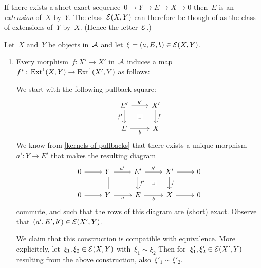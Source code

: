\begin{remark*}
   If there exists a short exact sequence~$0 \to Y \to E \to X \to 0$ then~$E$ is an \emph{extension} of~$X$ by~$Y$.
   The class~$\mathcal{E}(X,Y)$ can therefore be though of as the class of extensions of~$Y$ by~$X$.
   (Hence the letter~$\mathcal{E}$.)
\end{remark*}


\begin{remark}
  Let~$X$ and~$Y$ be objects in~$\mathcal{A}$ and let~$\xi = (a,E,b) \in \mathcal{E}(X,Y)$.
  \begin{enumerate}
    \item
      Every morphism~$f \colon X' \to X'$ in~$\mathcal{A}$ induces a map~$f^* \colon \operatorname{Ext}^1(X,Y) \to \operatorname{Ext}^1(X',Y)$ as follows:
      
      We start with the following pullback square:
      \[
        \begin{tikzcd}
            E'
            \arrow{r}[above]{b'}
            \arrow{d}[left]{f'}
            \arrow[phantom]{dr}[description]{\pb}
          & X'
            \arrow{d}[right]{f}
          \\
            E
            \arrow{r}[below]{b}
          & X
        \end{tikzcd}
      \]
      We know from \cref{kernels of pullbacks} that there exists a unique morphism~$a' \colon Y \to E'$ that makes the resulting diagram
      \[
        \begin{tikzcd}
            0
            \arrow{r}
          & Y
            \arrow{r}[above]{a'}
            \arrow[equal]{d}
          & E'
            \arrow{r}[above]{b'}
            \arrow{d}[right]{f'}
            \arrow[phantom]{dr}[description]{\pb}
          & X'
            \arrow{r}
            \arrow{d}[right]{f}
          & 0
          \\
            0
            \arrow{r}
          & Y
            \arrow{r}[below]{a}
          & E
            \arrow{r}[below]{b}
          & X
            \arrow{r}
          & 0
        \end{tikzcd}
      \]
      commute, and such that the rows of this diagram are (short) exact.
      Observe that~$(a', E', b') \in \mathcal{E}(X',Y)$.
      
      We claim that this construction is compatible with equivalence.
      More explicitely, let~$\xi_1, \xi_2 \in \mathcal{E}(X,Y)$ with~$\xi_1 \sim \xi_2$
      Then for~$\xi'_1, \xi'_2 \in \mathcal{E}(X', Y)$ resulting from the above construction, also~$\xi'_1 \sim \xi'_2$.
      

\end{enumerate}
\end{remark}
